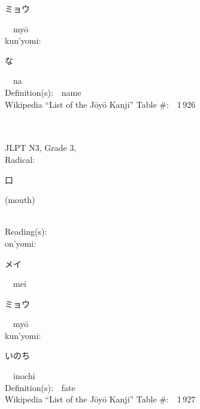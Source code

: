 \begin{multicols}{2}
{\hspace*{2em}}{\begin{CJK}{UTF8}{min} ミョウ \end{CJK}}\ \ my\=o\ \ \\
{\hspace*{1em}}kun'yomi:\ \ \\
{\hspace*{2em}}{\begin{CJK}{UTF8}{min} な \end{CJK}}\ \ na\ \ \\
Definition(s):\ \ name \\
Wikipedia ``List of the J\=oy\=o Kanji'' Table \#:\ \ 1\,926 \\
\ \ \\
{\fontsize{34pt}{40pt}  }\ \ \\  %
{JLPT N3, Grade 3, \\Radical:\ \ {\begin{CJK}{UTF8}{min} 口 \end{CJK}} (mouth) } \\
Reading(s):\ \ \\
{\hspace*{1em}}on'yomi:\ \ \\
{\hspace*{2em}}{\begin{CJK}{UTF8}{min} メイ \end{CJK}}\ \ mei\ \ \\
{\hspace*{2em}}{\begin{CJK}{UTF8}{min} ミョウ \end{CJK}}\ \ my\=o\ \ \\
{\hspace*{1em}}kun'yomi:\ \ \\
{\hspace*{2em}}{\begin{CJK}{UTF8}{min} いのち \end{CJK}}\ \ inochi\ \ \\
Definition(s):\ \ fate \\
Wikipedia ``List of the J\=oy\=o Kanji'' Table \#:\ \ 1\,927 \\
\ \ \\
{\fontsize{34pt}{40pt}  }\ \ \\  %

\end{multicols}
